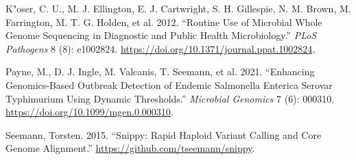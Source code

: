 \documentclass[
]{article}
\newlength{\cslhangindent}
\newenvironment{CSLReferences}[2] %
 {\begin{list}{}{%
  \setlength{\itemindent}{0pt}
  \setlength{\leftmargin}{0pt}
  \setlength{\parsep}{0pt}
  \ifodd #1
   \setlength{\leftmargin}{\cslhangindent}
   \setlength{\itemindent}{-1\cslhangindent}
  \fi
  \setlength{\itemsep}{#2\baselineskip}}}
 {\end{list}}
\begin{document}
\protect{}\label{refs}
\begin{CSLReferences}{1}{0}
K"oser, C. U., M. J. Ellington, E. J. Cartwright, S. H. Gillespie, N. M.
Brown, M. Farrington, M. T. G. Holden, et al. 2012. {``Routine Use of
Microbial Whole Genome Sequencing in Diagnostic and Public Health
Microbiology.''} \emph{PLoS Pathogens} 8 (8): e1002824.
\url{https://doi.org/10.1371/journal.ppat.1002824}.

Payne, M., D. J. Ingle, M. Valcanis, T. Seemann, et al. 2021.
{``Enhancing Genomics-Based Outbreak Detection of Endemic Salmonella
Enterica Serovar Typhimurium Using Dynamic Thresholds.''}
\emph{Microbial Genomics} 7 (6): 000310.
\url{https://doi.org/10.1099/mgen.0.000310}.

Seemann, Torsten. 2015. {``Snippy: Rapid Haploid Variant Calling and
Core Genome Alignment.''} \url{https://github.com/tseemann/snippy}.

\end{CSLReferences}
\end{document}
